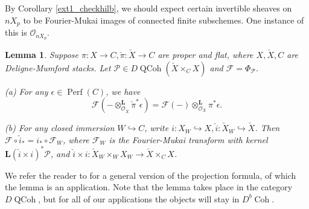 \documentclass{amsart}
\theoremstyle{plain}
\newtheorem{lemma}[theorem]{Lemma}
\theoremstyle{definition}
\theoremstyle{remark}
\begin{document}
    By Corollary \ref{ext1_checkhilb}, we should expect certain invertible sheaves on $nX_p$ to be Fourier-Mukai images of connected finite subschemes.
    One instance of this is $\mathcal O_{nX_p}$.
    \begin{lemma}\label{relative_fm_bc}
        Suppose $\pi:X\to C, \check\pi:\check{X}\to C$ are proper and flat, where $X,\check{X},C$ are Deligne-Mumford stacks.
        Let $\mathcal P\in D\operatorname{QCoh}(\check{X}\times_C X)$ and $\mathcal F=\Phi_{\mathcal P}$.

        (a) For any $\epsilon\in \operatorname{Perf}(C)$, we have
        \[
            \mathcal F(-\otimes_{\mathcal O_{\check{X}}}^{\mathbf L}\check\pi^\ast\epsilon)=\mathcal F(-)\otimes_{\mathcal O_X}^{\mathbf L}\pi^\ast\epsilon.
        \]

        (b) For any closed immersion $W\hookrightarrow C$, write $i:X_W\hookrightarrow X,\check{i}:\check{X}_W\hookrightarrow\check{X}$.
        Then $\mathcal F\circ\check{i}_\ast=i_\ast\circ\mathcal F_W$, where $\mathcal F_W$ is the Fourier-Mukai transform with kernel $\mathbf L(\check{i}\times i)^\ast\mathcal P$, and $\check{i}\times i:\check X_W\times_WX_W\to \check{X}\times_CX$.
    \end{lemma}
    We refer the reader to \cite[Corollary 4.12]{hallrydh} for a general version of the projection formula, of which the lemma is an application.
    Note that the lemma takes place in the category $D\operatorname{QCoh}$, but for all of our applications the objects will stay in $D^b\operatorname{Coh}$.
\end{document}
